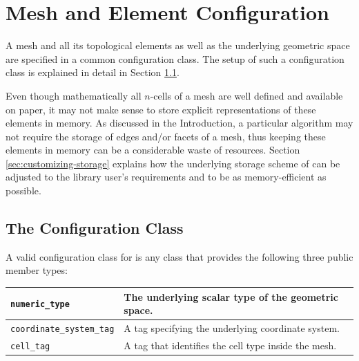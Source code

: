 \chapter{Mesh and Element Configuration} \label{chap:meshconfig}



A mesh and all its topological elements as well as the underlying geometric space are specified in a common configuration class.
The setup of such a configuration class is explained in detail in Section \ref{sec:config-class}.

Even though mathematically all $n$-cells of a mesh are well defined and available on paper, it may not make sense to store explicit representations of these elements in memory.
As discussed in the Introduction, a particular algorithm may not require the storage of edges and/or facets of a mesh, thus keeping these elements in memory can be a considerable waste of resources.
Section \ref{sec:customizing-storage} explains how the underlying storage scheme of {\ViennaGrid} can be adjusted to the library user's requirements and to be as memory-efficient as possible.


\section{The Configuration Class} \label{sec:config-class}
A valid configuration class for {\ViennaGrid} is any class that provides the following three public member types:
\begin{center}
\begin{tabular}{|l|p{8cm}|}
\hline
 \lstinline|numeric_type|   & The underlying scalar type of the geometric space. \\
\hline
 \lstinline|coordinate_system_tag| & A tag specifying the underlying coordinate system.\\
\hline
 \lstinline|cell_tag|       & A tag that identifies the cell type inside the mesh.\\
\hline
\end{tabular}
\end{center}

